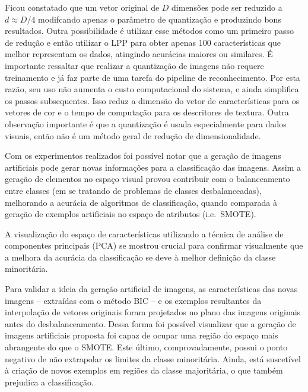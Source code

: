 
%
%
%
%
%
%

Ficou constatado que um vetor original de $D$ dimensões pode ser reduzido a $d \approx D/4$ modifcando apenas o parâmetro de quantização e produzindo bons resultados. Outra possibilidade é utilizar esse métodos como um primeiro passo de redução e então utilizar o LPP para obter apenas 100 características que melhor representam os dados, atingindo acurácias maiores ou similares.
É importante ressaltar que realizar a quantização de imagens não requere treinamento e já faz parte de uma tarefa do pipeline de reconhecimento. Por esta razão, seu uso não aumenta o custo computacional do sistema, e ainda simplifica os passos subsequentes. Isso reduz a dimensão do vetor de características para os vetores de cor e o tempo de computação para os descritores de textura. Outra observação importante é que a quantização é usada especialmente para dados visuais, então não é um método geral de redução de dimensionalidade.



Com os experimentos realizados foi possível notar que a geração de imagens artificiais pode gerar novas informações para a classificação das imagens. Assim a geração de elementos no espaço visual provou contribuir com o balanceamento entre classes (em se tratando de problemas de classes desbalanceadas), melhorando a acurácia de algoritmos de classificação, quando comparada à geração de exemplos artificiais no espaço de atributos (i.e.\ SMOTE).

A visualização do espaço de características utilizando a técnica de análise de componentes principais (PCA) se mostrou crucial para confirmar visualmente que a melhora da acurácia da classificação se deve à melhor definição da classe minoritária.

Para validar a ideia da geração artificial de imagens, as características das novas imagens -- extraídas com o método BIC  -- e os exemplos resultantes da interpolação de vetores originais foram projetados no plano das imagens originais antes do desbalanceamento. Dessa forma foi possível visualizar que a geração de imagens artificiais proposta foi capaz de ocupar uma região do espaço mais abrangente do que o SMOTE. Este último, comprovadamente, possui o ponto negativo de não extrapolar os limites da classe minoritária. Ainda, está suscetível à criação de novos exemplos em regiões da classe majoritária, o que também prejudica a classificação.

